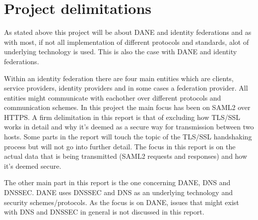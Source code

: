 \section{Project delimitations}
As stated above this project will be about DANE and identity federations and as with most, if not all implementation of different protocols and standards, alot of underlying technology is used.
This is also the case with DANE and identity federations.

Within an identity federation there are four main entities which are clients, service providers, identity providers and in some cases a federation provider.
All entities might communicate with eachother over different protocols and communication schemes.
In this project the main focus has been on SAML2 over HTTPS.
A firm delimitation in this report is that of excluding how TLS/SSL works in detail and why it's deemed as a secure way for transmission between two hosts.
Some parts in the report will touch the topic of the TLS/SSL handshaking process but will not go into further detail.
The focus in this report is on the actual data that is being transmitted (SAML2 requests and responses) and how it's deemed secure. 

The other main part in this report is the one concerning DANE, DNS and DNSSEC.
DANE uses DNSSEC and DNS as an underlying technology and security schemes/protocols.
As the focus is on DANE, issues that might exist with DNS and DNSSEC in general is not discussed in this report.





